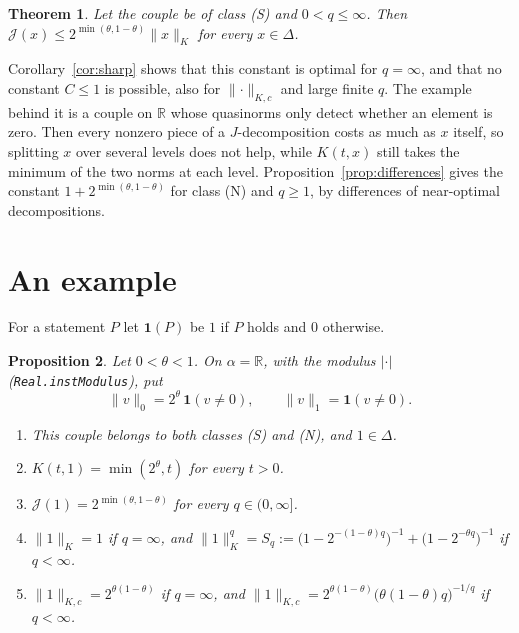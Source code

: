 \documentclass[11pt]{article}
\newtheorem{theorem}{Theorem}
\newtheorem{proposition}[theorem]{Proposition}
\theoremstyle{remark}
\newcommand{\abs}[1]{\lvert #1\rvert}
\newcommand{\norm}[2]{\lVert #1\rVert_{#2}}
\newcommand{\cJ}{\mathcal J}
\newcommand{\R}{\mathbb R}
\newcommand{\one}{\mathbf 1}
\begin{document}
\begin{theorem}\label{thm:solid}
  Let the couple be of class (S) and \(0 < q \le \infty\). Then
  \(\cJ(x) \le 2^{\min(\theta,1-\theta)} \norm{x}{K}\) for every \(x \in \Delta\).
\end{theorem}

Corollary~\ref{cor:sharp} shows that this constant is optimal for \(q = \infty\), and that
no constant \(C \le 1\) is possible, also for \(\norm{\cdot}{K,c}\) and large finite \(q\).
The example behind it is a couple on \(\R\) whose quasinorms only detect whether an element
is zero. Then every nonzero piece of a \(J\)-decomposition costs as much as \(x\) itself, so
splitting \(x\) over several levels does not help, while \(K(t,x)\) still takes the minimum of
the two norms at each level. Proposition~\ref{prop:differences} gives the constant
\(1 + 2^{\min(\theta,1-\theta)}\) for class (N) and \(q \ge 1\), by differences of
near-optimal decompositions.

\section{An example}

For a statement \(P\) let \(\one(P)\) be \(1\) if \(P\) holds and \(0\) otherwise.

\begin{proposition}\label{prop:example}
  Let \(0 < \theta < 1\). On \(\alpha = \R\), with the modulus \(\abs{\cdot}\)
  (\texttt{Real.instModulus}), put
  \[
    \norm{v}{0} = 2^\theta\, \one(v \ne 0), \qquad \norm{v}{1} = \one(v \ne 0).
  \]
  \begin{enumerate}
    \item[(a)] This couple belongs to both classes (S) and (N), and \(1 \in \Delta\).
    \item[(b)] \(K(t, 1) = \min(2^\theta, t)\) for every \(t > 0\).
    \item[(c)] \(\cJ(1) = 2^{\min(\theta, 1-\theta)}\) for every \(q \in (0, \infty]\).
    \item[(d)] \(\norm{1}{K} = 1\) if \(q = \infty\), and
      \(\norm{1}{K}^q = S_q := \bigl(1 - 2^{-(1-\theta)q}\bigr)^{-1} + \bigl(1 - 2^{-\theta q}\bigr)^{-1}\)
      if \(q < \infty\).
    \item[(e)] \(\norm{1}{K,c} = 2^{\theta(1-\theta)}\) if \(q = \infty\), and
      \(\norm{1}{K,c} = 2^{\theta(1-\theta)} \bigl(\theta(1-\theta) q\bigr)^{-1/q}\) if
      \(q < \infty\).
  \end{enumerate}
\end{proposition}
\end{document}
